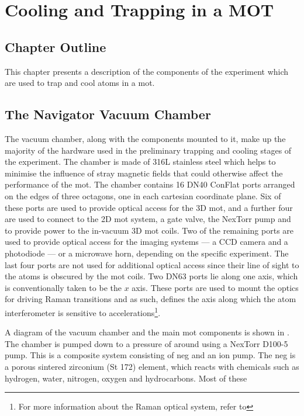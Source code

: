 \chapter{Cooling and Trapping in a MOT}
\section{Chapter Outline}
This chapter presents a description of the components of the experiment which
are used to trap and cool atoms in a \ac{mot}. 
\section{The Navigator Vacuum Chamber}\label{sec:vacuum_chamber}
The vacuum chamber, along with the components mounted to it, make up the
majority of the hardware used in the preliminary trapping and cooling stages
of the experiment. The chamber is made of 316L stainless steel which helps to
minimise the influence of stray magnetic fields that could otherwise affect
the performance of the \ac{mot}. The chamber contains 16 DN40 ConFlat ports
arranged on the edges of three octagons, one in each cartesian coordinate
plane. Six of these ports are used to provide optical access for the 3D
\ac{mot}, and a further four are used to connect to the 2D \ac{mot} system, a
gate valve, the NexTorr pump and to provide power to the in-vacuum 3D
\ac{mot} coils. Two of the remaining ports are used to provide optical access
for the imaging systems --- a CCD camera and a photodiode --- or a microwave
horn, depending on the specific experiment. The last four ports are not used
for additional optical access since their line of sight to the atoms is
obscured by the \ac{mot} coils. Two DN63 ports lie along one axis, which is
conventionally taken to be the \(x\) axis. These ports are used to mount the
optics for driving Raman transitions and as such, defines the axis along
which the atom interferometer is sensitive to accelerations\footnote{For more
information about the Raman optical system, refer to
}. \par\noindent
A diagram of the vacuum chamber and the main \ac{mot} components is shown in
. The chamber is pumped down to a pressure of
around \sivalue{}{\milli\bar} using a NexTorr D100-5 pump. This
is a composite system consisting of \ac{neg} and an ion pump. The \ac{neg} is
a porous sintered zirconium (St 172) element, which reacts with chemicals
such as hydrogen, water, nitrogen, oxygen and hydrocarbons. Most of these
